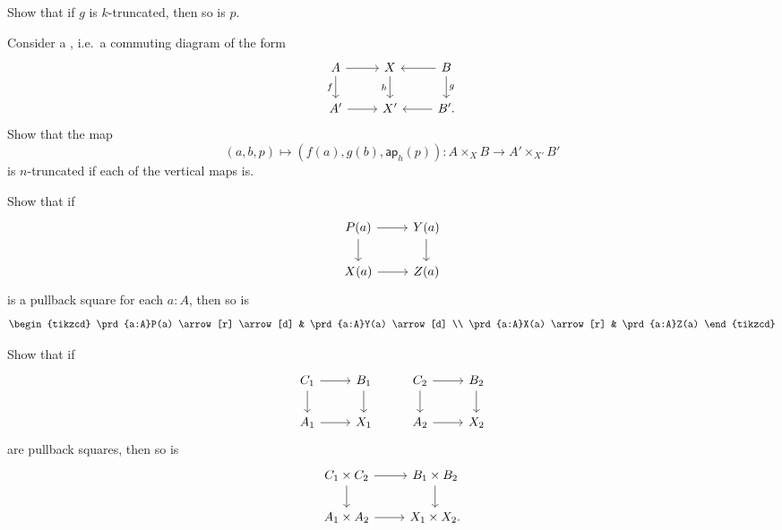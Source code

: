 \begin{exercises}
Show that if $g$ is $k$-truncated, then so is $p$.
\item Consider a , i.e.~a commuting diagram of the form
\begin{equation*}
\begin{tikzcd}
A \arrow[r] \arrow[d,swap,"f"] & X \arrow[d,swap,"h"] & B \arrow[l] \arrow[d,"g"] \\
A' \arrow[r] & X' & B'. \arrow[l]
\end{tikzcd}
\end{equation*}
Show that the map
\begin{equation*}
(a,b,p)\mapsto (f(a),g(b),\mathsf{ap}_h(p)): A \times_X B \to A'\times_{X'} B'
\end{equation*}
is $n$-truncated if each of the vertical maps is.
\item 
\begin{subexenum}
\item Show that if 
\begin{equation*}
\begin{tikzcd}
P(a) \arrow[r] \arrow[d] & Y(a) \arrow[d] \\
X(a) \arrow[r] & Z(a)
\end{tikzcd}
\end{equation*}
is a pullback square for each $a:A$, then so is
\begin{equation*}
\begin{tikzcd}
\prd{a:A}P(a) \arrow[r] \arrow[d] & \prd{a:A}Y(a) \arrow[d] \\
\prd{a:A}X(a) \arrow[r] & \prd{a:A}Z(a)
\end{tikzcd}
\end{equation*}
\item Show that if
\begin{equation*}
\begin{tikzcd}
C_1 \arrow[r] \arrow[d] & B_1 \arrow[d] & C_2 \arrow[r] \arrow[d] & B_2 \arrow[d] \\
A_1 \arrow[r] & X_1 & A_2 \arrow[r] & X_2
\end{tikzcd}
\end{equation*}
are pullback squares, then so is
\begin{equation*}
\begin{tikzcd}
C_1\times C_2 \arrow[r] \arrow[d] & B_1\times B_2 \arrow[d] \\
A_1 \times A_2 \arrow[r] & X_1\times X_2. 
\end{tikzcd}

\end{equation*}
\end{subexenum}
\end{exercises}
